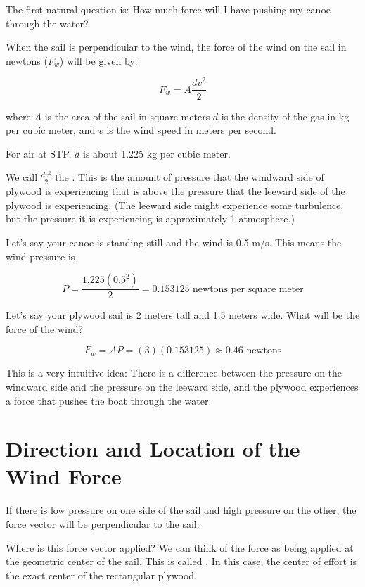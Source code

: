 The first natural question is: How much force will I have pushing my canoe through the water?
\begin{mdframed}[style=important, frametitle={Wind Force}]

When the sail is perpendicular to the wind,  the force of the wind on the sail in newtons ($F_w$) will be given by:

$$F_w = A \frac{d v^2}{2}$$

where $A$ is the area of the sail in square meters  $d$ is the density of the gas in kg per cubic meter, and $v$ is the wind speed in meters per second.

For air at STP,  $d$ is about 1.225 kg per cubic meter.

We call $\frac{d v^2}{2}$  the .  This is the amount of pressure that the windward side of plywood is experiencing that is above the
 pressure that the leeward side of the plywood is experiencing.  (The leeward side might experience some turbulence,  but the pressure it is experiencing is
 approximately 1 atmosphere.)

\end{mdframed}

Let's say your canoe is standing still and the wind is 0.5 m/s.  This means the wind pressure is

$$P =  \frac{1.225 (0.5^2)}{2} =  0.153125 \text{ newtons per square meter}$$

Let's say your plywood sail is 2 meters tall and 1.5 meters wide.  What will be the force of the wind?

$$F_w  = A P = (3)(0.153125) \approx 0.46 \text{ newtons}$$

This is a very intuitive idea: There is a difference between the pressure on the windward side and the pressure on the leeward side, and the plywood experiences a force that pushes
the boat through the water.


\section{Direction and Location of the Wind Force}

If there is low pressure on one side of the sail and high pressure on the other,  the force vector will be perpendicular to the sail.

Where is this force vector applied?  We can think of the force as being applied at the geometric center of the sail.  This is called . In this case,  the center of effort is the exact center of the rectangular plywood.

